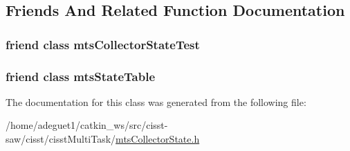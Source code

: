 \subsection{Friends And Related Function Documentation}
\hypertarget{classmts_collector_state_a9e2828100f64238c027a54e6a38b8307}{
\subsubsection[{mts\-Collector\-State\-Test}]{\setlength{\rightskip}{0pt plus 5cm}friend class mts\-Collector\-State\-Test\hspace{0.3cm}{\ttfamily [friend]}}}\label{classmts_collector_state_a9e2828100f64238c027a54e6a38b8307}
\hypertarget{classmts_collector_state_af4d045a97beae5ceb1642100f69e82c9}{
\subsubsection[{mts\-State\-Table}]{\setlength{\rightskip}{0pt plus 5cm}friend class {\bf mts\-State\-Table}\hspace{0.3cm}{\ttfamily [friend]}}}\label{classmts_collector_state_af4d045a97beae5ceb1642100f69e82c9}


The documentation for this class was generated from the following file\-:\begin{DoxyCompactItemize}
\item 
/home/adeguet1/catkin\-\_\-ws/src/cisst-\/saw/cisst/cisst\-Multi\-Task/\hyperlink{mts_collector_state_8h}{mts\-Collector\-State.\-h}\end{DoxyCompactItemize}
